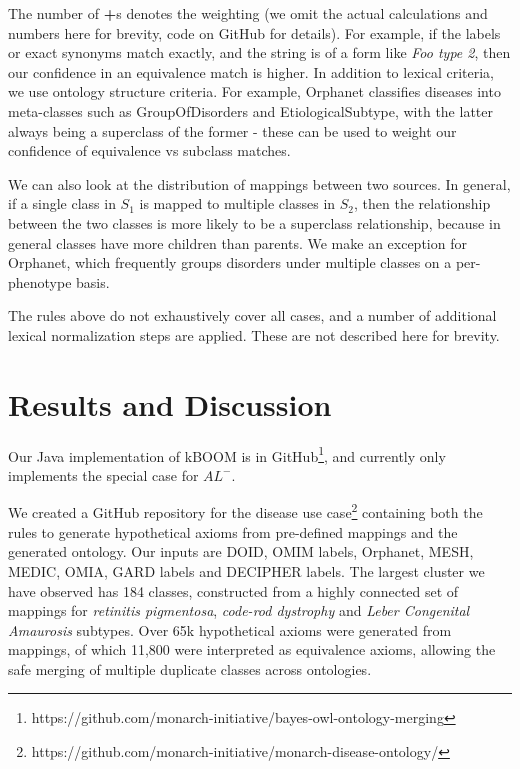 \documentclass{my}
\begin{document}
The number of \textbf{+}s denotes the weighting (we omit the actual
calculations and numbers here for brevity, code on GitHub for
details). For example, if the labels or exact synonyms match exactly,
and the string is of a form like \emph{Foo type 2}, then our confidence
in an equivalence match is higher. In addition to lexical criteria, we
use ontology structure criteria. For example, Orphanet classifies
diseases into meta-classes such as GroupOfDisorders and
EtiologicalSubtype, with the latter always being a superclass of the
former - these can be used to weight our confidence of equivalence vs
subclass matches.

We can also look at the distribution of mappings between two
sources. In general, if a single class in $S_1$ is mapped to multiple
classes in $S_2$, then the relationship between the two classes is
more likely to be a superclass relationship, because in general
classes have more children than parents. We make an exception for
Orphanet, which frequently groups disorders under multiple classes on
a per-phenotype basis.

The rules above do not exhaustively cover all cases, and a number of
additional lexical normalization steps are applied. These are not
described here for brevity.

\section{Results and Discussion}

Our Java implementation of kBOOM is in
GitHub\footnote{https://github.com/monarch-initiative/bayes-owl-ontology-merging},
and currently only implements the special case for $AL^{-}$.

We created a GitHub repository for the disease use
case\footnote{https://github.com/monarch-initiative/monarch-disease-ontology/}
containing both the rules to generate hypothetical axioms from
pre-defined mappings and the generated ontology. Our inputs are DOID,
OMIM labels, Orphanet, MESH, MEDIC, OMIA, GARD labels and DECIPHER
labels. The largest cluster we
have observed has 184 classes, constructed from a highly connected set
of mappings for \emph{retinitis pigmentosa}, \emph{code-rod dystrophy} and \emph{Leber
Congenital Amaurosis} subtypes. Over 65k hypothetical axioms were
generated from mappings, of which 11,800 were interpreted as
equivalence axioms, allowing the safe merging of multiple duplicate
classes across ontologies.
\end{document}
